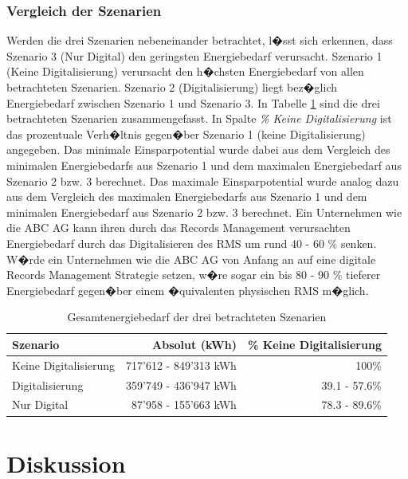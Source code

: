 \documentclass[a4paper,twoside,10pt]{report}
\begin{document}
\subsection{Vergleich der Szenarien}
Werden die drei Szenarien nebeneinander betrachtet, l�sst sich erkennen, dass Szenario 3 (Nur Digital) den geringsten Energiebedarf verursacht. Szenario 1 (Keine Digitalisierung) verursacht den h�chsten Energiebedarf von allen betrachteten Szenarien. Szenario 2 (Digitalisierung) liegt bez�glich Energiebedarf zwischen Szenario 1 und Szenario 3. In Tabelle \ref{tab:ges_energ_szenvgl} sind die drei betrachteten Szenarien zusammengefasst. In Spalte \emph{\% Keine Digitalisierung} ist das prozentuale Verh�ltnis gegen�ber Szenario 1 (keine Digitalisierung) angegeben. Das minimale Einsparpotential wurde dabei aus dem Vergleich des minimalen Energiebedarfs aus Szenario 1 und dem maximalen Energiebedarf aus Szenario 2 bzw. 3 berechnet. Das maximale Einsparpotential wurde analog dazu aus dem Vergleich des maximalen Energiebedarfs aus Szenario 1 und dem minimalen Energiebedarf aus Szenario 2 bzw. 3 berechnet.  Ein Unternehmen wie die ABC AG kann ihren durch das Records Management verursachten Energiebedarf durch das Digitalisieren des \ac{RMS} um rund 40 - 60 \% senken. W�rde ein Unternehmen wie die ABC AG von Anfang an auf eine digitale Records Management Strategie setzen, w�re sogar ein bis 80 - 90 \% tieferer Energiebedarf gegen�ber einem �quivalenten physischen \ac{RMS} m�glich.

\begin{table} [h]
	\begin{tabular}{l|r|r}
	\hline
	\textbf{Szenario} & \textbf{Absolut (kWh)} & \textbf{\% Keine Digitalisierung}\\
	\hline
	Keine Digitalisierung		&	717'612 - 849'313 kWh	& 100\%	\\
	Digitalisierung			 		& 359'749 - 436'947 kWh	& 39.1 - 57.6\%	\\
	Nur Digital 						& 87'958 - 155'663  kWh & 78.3 - 89.6\%	\\
	\hline
	\end{tabular}
\caption{Gesamtenergiebedarf der drei betrachteten Szenarien} 
\label{tab:ges_energ_szenvgl}
\end{table}


\acresetall
\chapter{Diskussion}\label{diskussion}
\end{document}
